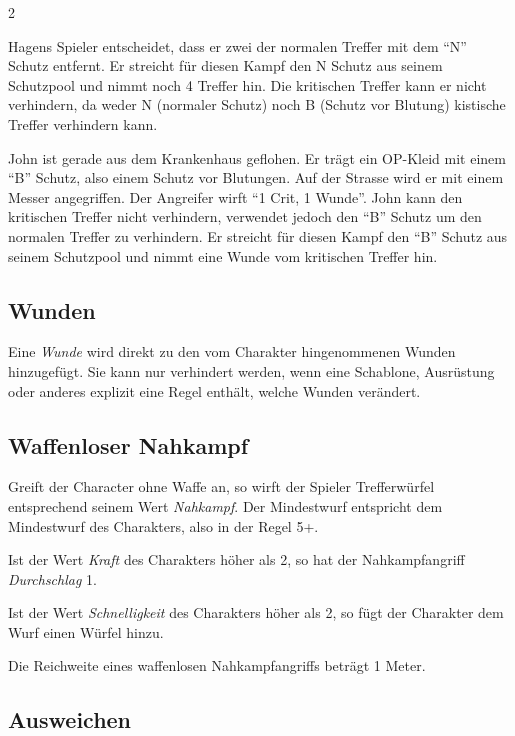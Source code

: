 \begin{multicols}{2}
\begin{pexample}[Beispiel]
{\begin{pexample}[Beispiel]
Hagens Spieler entscheidet, dass er zwei der normalen Treffer mit dem ``N'' Schutz entfernt. Er streicht für diesen Kampf den N Schutz aus seinem Schutzpool und nimmt noch 4 Treffer hin. Die kritischen Treffer kann er nicht verhindern, da weder N (normaler Schutz) noch B (Schutz vor Blutung) kistische Treffer verhindern kann.
\end{pexample}
}{
\begin{pexample}[Beispiel]
John ist gerade aus dem Krankenhaus geflohen. Er trägt ein OP-Kleid mit einem ``B'' Schutz, also einem Schutz vor Blutungen. Auf der Strasse wird er mit einem Messer angegriffen. Der Angreifer wirft ``1 Crit, 1 Wunde''. John kann den kritischen Treffer nicht verhindern, verwendet jedoch den ``B'' Schutz um den normalen Treffer zu verhindern. Er streicht für diesen Kampf den ``B'' Schutz aus seinem Schutzpool und nimmt eine Wunde vom kritischen Treffer hin.
\end{pexample}
}

\subsection{Wunden}

Eine \textit{Wunde} wird direkt zu den vom Charakter hingenommenen Wunden hinzugefügt. Sie kann nur verhindert werden, wenn eine Schablone, Ausrüstung oder anderes explizit eine Regel enthält, welche Wunden verändert.

\subsection{Waffenloser Nahkampf}

Greift der Character ohne Waffe an, so wirft der Spieler Trefferwürfel entsprechend seinem Wert \textit{Nahkampf}. Der Mindestwurf entspricht dem Mindestwurf des Charakters, also in der Regel 5+.

Ist der Wert \textit{Kraft} des Charakters höher als 2, so hat der Nahkampfangriff \textit{Durchschlag} 1.

Ist der Wert \textit{Schnelligkeit} des Charakters höher als 2, so fügt der Charakter dem Wurf einen Würfel hinzu.

Die Reichweite eines waffenlosen Nahkampfangriffs beträgt 1 Meter.

\subsection{Ausweichen}


\end{pexample}
\end{multicols}
